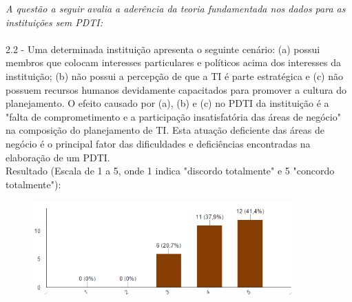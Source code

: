 \textit{A questão a seguir avalia a aderência da teoria fundamentada nos dados para as instituições sem PDTI:}
\\
\\2.2 - Uma determinada instituição apresenta o seguinte cenário: (a) possui membros que colocam interesses particulares e políticos acima dos interesses da instituição; (b) não possui a percepção de que a TI é parte estratégica e (c) não possuem recursos humanos devidamente capacitados para promover a cultura do planejamento. O efeito causado por (a), (b) e (c) no PDTI da instituição é a "falta de comprometimento e a participação insatisfatória das áreas de negócio" na composição do planejamento de TI. Esta atuação deficiente das áreas de negócio é o principal fator das dificuldades e deficiências encontradas na elaboração de um PDTI.
\\Resultado (Escala de 1 a 5, onde 1 indica "discordo totalmente" e 5 "concordo totalmente"):
\begin{figure}[h]
\centering %
\includegraphics[width=10cm, frame]{figuras/grafico_ava_grupoComPDTI.PNG}
\end{figure}